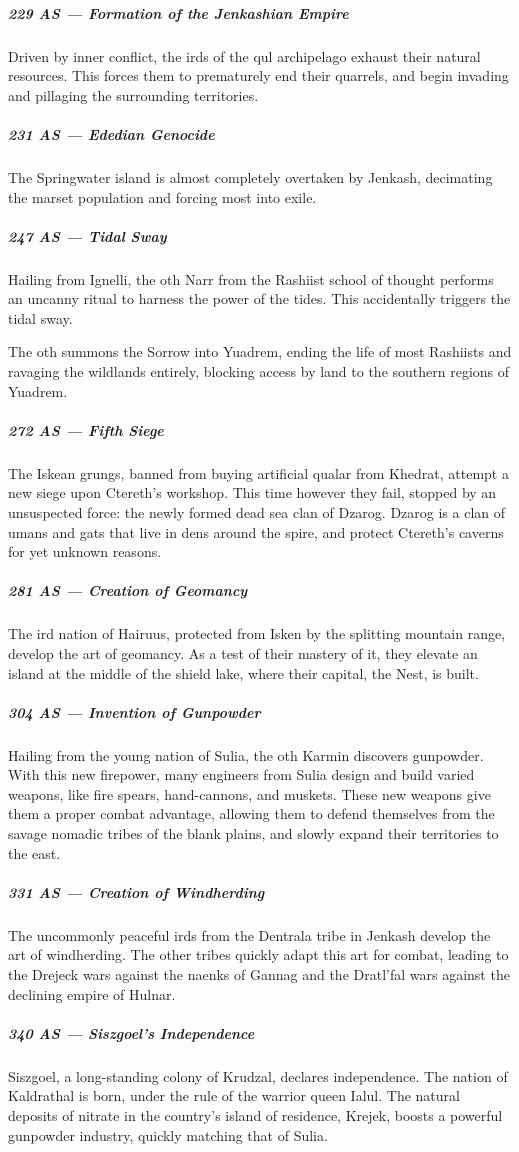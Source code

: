 \begin{linenumbers}
\subparagraph{229 AS --- Formation of the Jenkashian Empire} Driven by inner conflict, the irds of the qul archipelago exhaust their natural resources.
This forces them to prematurely end their quarrels, and begin invading and pillaging the surrounding territories.

\subparagraph{231 AS --- Ededian Genocide} The Springwater island is almost completely overtaken by Jenkash, decimating the marset population and forcing most into exile.

\subparagraph{247 AS --- Tidal Sway} Hailing from Ignelli, the oth Narr from the Rashiist school of thought performs an uncanny ritual to harness the power of the tides.
This accidentally triggers the tidal sway.

The oth summons the Sorrow into Yuadrem, ending the life of most Rashiists and ravaging the wildlands entirely, blocking access by land to the southern regions of Yuadrem.

\subparagraph{272 AS --- Fifth Siege} The Iskean grungs, banned from buying artificial qualar from Khedrat, attempt a new siege upon Ctereth's workshop.
This time however they fail, stopped by an unsuspected force: the newly formed dead sea clan of Dzarog.
Dzarog is a clan of umans and gats that live in dens around the spire, and protect Ctereth's caverns for yet unknown reasons.

\subparagraph{281 AS --- Creation of Geomancy} The ird nation of Hairuus, protected from Isken by the splitting mountain range, develop the art of geomancy.
As a test of their mastery of it, they elevate an island at the middle of the shield lake, where their capital, the Nest, is built.

\subparagraph{304 AS --- Invention of Gunpowder} Hailing from the young nation of Sulia, the oth Karmin discovers gunpowder.
With this new firepower, many engineers from Sulia design and build varied weapons, like fire spears, hand-cannons, and muskets.
These new weapons give them a proper combat advantage, allowing them to defend themselves from the savage nomadic tribes of the blank plains, and slowly expand their territories to the east.

\subparagraph{331 AS --- Creation of Windherding} The uncommonly peaceful irds from the Dentrala tribe in Jenkash develop the art of windherding.
The other tribes quickly adapt this art for combat, leading to the Drejeck wars against the naenks of Gannag and the Dratl'fal wars against the declining empire of Hulnar.

\subparagraph{340 AS --- Siszgoel's Independence} Siszgoel, a long-standing colony of Krudzal, declares independence.
The nation of Kaldrathal is born, under the rule of the warrior queen Ialul.
The natural deposits of nitrate in the country's island of residence, Krejek, boosts a powerful gunpowder industry, quickly matching that of Sulia.


\end{linenumbers}
